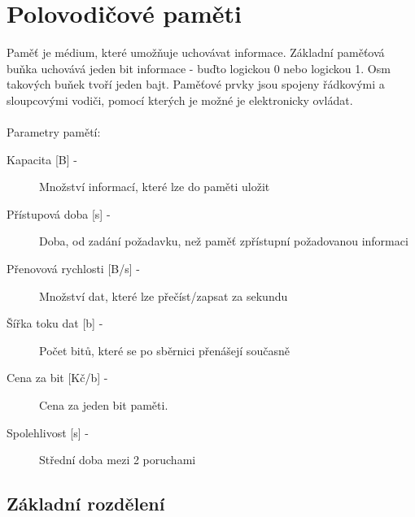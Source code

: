 \section{Polovodičové paměti}
Paměť je médium, které umožňuje uchovávat informace.
Základní paměťová buňka uchovává jeden bit informace - buďto logickou 0 nebo logickou 1.
Osm takových buňek tvoří jeden bajt.
Paměťové prvky jsou spojeny řádkovými a sloupcovými vodiči, pomocí kterých je možné je elektronicky ovládat.\\ \\
Parametry pamětí:
\begin{description}
    \item [Kapacita {[B]} -] Množství informací, které lze do paměti uložit
    \item [Přístupová doba {[s]} -] Doba, od zadání požadavku, než paměť zpřístupní požadovanou informaci
    \item [Přenovová rychlosti {[B/s]} -] Množství dat, které lze přečíst/zapsat za sekundu
    \item [Šířka toku dat {[b]} -] Počet bitů, které se po sběrnici přenášejí současně
    \item [Cena za bit {[Kč/b]} -] Cena za jeden bit paměti.
    \item [Spolehlivost {[s]} -] Střední doba mezi 2 poruchami
\end{description}
\subsection{Základní rozdělení}

